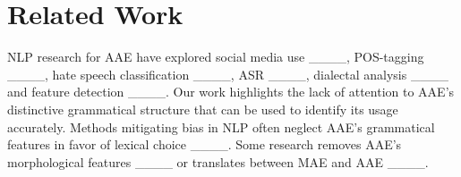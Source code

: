 \section{Related Work}
NLP research for AAE have explored social media use ____, POS-tagging ____, hate speech classification ____, ASR ____, dialectal analysis
____ and feature detection ____. Our work highlights the lack of attention to AAE's distinctive grammatical structure that can be used to identify its usage accurately. Methods mitigating bias in NLP often neglect AAE's grammatical features in favor of lexical choice 
____. Some research removes AAE's morphological features ____ or translates between MAE and AAE ____.